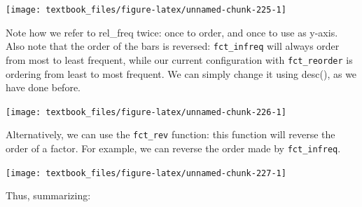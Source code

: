 \documentclass[]{tufte-book}
\newenvironment{Shaded}{}{}
\newcommand{\DataTypeTok}[1]{\textcolor[rgb]{0.56,0.13,0.00}{#1}}
\newcommand{\KeywordTok}[1]{\textcolor[rgb]{0.00,0.44,0.13}{\textbf{#1}}}
\newcommand{\NormalTok}[1]{#1}
\newcommand{\OperatorTok}[1]{\textcolor[rgb]{0.40,0.40,0.40}{#1}}
\newcommand{\StringTok}[1]{\textcolor[rgb]{0.25,0.44,0.63}{#1}}
\begin{document}
\texttt{[image: textbook\_files/figure-latex/unnamed-chunk-225-1]}

Note how we refer to rel\_freq twice: once to order, and once to use as y-axis. Also note that the order of the bars is reversed: \texttt{fct\_infreq} will always order from most to least frequent, while our current configuration with \texttt{fct\_reorder} is ordering from least to most frequent. We can simply change it using desc(), as we have done before.

\begin{Shaded}
\end{Shaded}

\texttt{[image: textbook\_files/figure-latex/unnamed-chunk-226-1]}

Alternatively, we can use the \texttt{fct\_rev} function: this function will reverse the order of a factor. For example, we can reverse the order made by \texttt{fct\_infreq}.

\begin{Shaded}
\end{Shaded}

\texttt{[image: textbook\_files/figure-latex/unnamed-chunk-227-1]}

Thus, summarizing:
\end{document}
